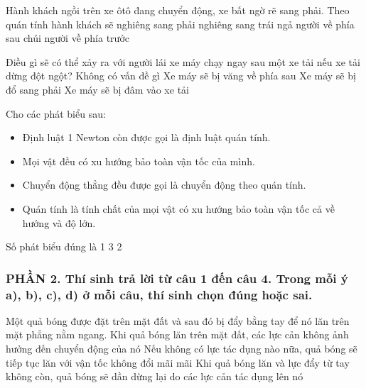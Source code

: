 \begin{ex}%
Hành khách ngồi trên xe ôtô đang chuyển động, xe bất ngờ rẽ sang phải. Theo quán tính hành khách sẽ
\choice
{nghiêng sang phải}
{\True nghiêng sang trái}
{ngả người về phía sau}
{chúi người về phía trước}
 \end{ex}
\begin{ex}%
Điều gì sẽ có thể xảy ra với người lái xe máy chạy ngay sau một xe tải nếu xe tải dừng đột ngột?
\choice
{Không có vấn đề gì}
{Xe máy sẽ bị văng về phía sau}
{Xe máy sẽ bị đổ sang phải}
{\True Xe máy sẽ bị đâm vào xe tải}
\end{ex}
\begin{ex}%
Cho các phát biểu sau:
\begin{itemize}
\item[(1)] Định luật 1 Newton còn được gọi là định luật quán tính.
\item[(2)] Mọi vật đều có xu hướng bảo toàn vận tốc của mình.
\item[(3)] Chuyển động thẳng đều được gọi là chuyển động theo quán tính.
\item[(4)] Quán tính là tính chất của mọi vật có xu hướng bảo toàn vận tốc cả về hướng và độ lớn.
\end{itemize}
Số phát biểu đúng là	
\choice
{1}
{}
{3}
{2}
  \end{ex}















\subsubsection*{PHẦN 2. Thí sinh trả lời từ câu 1 đến câu 4. Trong mỗi ý a), b), c), d) ở mỗi câu, thí sinh chọn đúng hoặc sai.}
\setcounter{ex}{0}
\begin{ex}%
Một quả bóng được đặt trên mặt đất và sau đó bị đẩy bằng tay để nó lăn trên mặt phẳng nằm ngang.
{Khi quả bóng lăn trên mặt đất, các lực cản không ảnh hưởng đến chuyển động của nó} 
{\True Nếu không có lực tác dụng nào nữa, quả bóng sẽ tiếp tục lăn với vận tốc không đổi mãi mãi} 
{\True Khi quả bóng lăn và lực đẩy từ tay không còn, quả bóng sẽ dần dừng lại do các lực cản tác dụng lên nó} 
\loigiai{}
\end{ex}

